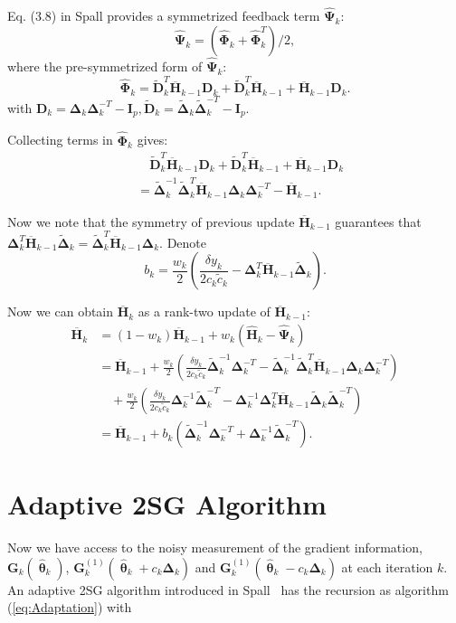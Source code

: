 \documentclass[conference]{IEEEtran}
\newcommand{\bD}{\bm{D}}
\newcommand{\bG}{\bm{G}}
\newcommand{\bI}{\bm{I}}
\newcommand{\bDelta}{\bm{\Delta}}
\newcommand{\oH}{\bm{\overline{H}}}
\newcommand{\hH}{\bm{\hat{H}}}
\newcommand{\hPsi}{\bm{\hat{\Psi}}}
\newcommand{\htheta}{\bm{\hat{\uptheta}}}
\newcommand{\hPhi}{\bm{\hat{\Phi}}}
\newcommand{\tDelta}{\bm{\tilde{\Delta}}}
\newcommand{\tD}{\bm{\tilde{D}}}
\begin{document}
Eq. (3.8) in Spall \cite{Spall2009} provides a symmetrized feedback term $ \hPsi_k $:
\begin{equation} \label{eq:PsiHat}
\hPsi_k =(\hPhi_k+\hPhi_k^T)/2,
\end{equation}
where the pre-symmetrized form of $ \hPsi_k $:
\begin{equation}
\hPhi_k=\tD_k^T\oH_{k-1}\bD_k+\tD_k^T\oH_{k-1}+\oH_{k-1}\bD_k.
\end{equation}
with $ \bD_k=\bDelta_k\bDelta_k^{-T}-\bI_p, \tD_k=\tDelta_k\tDelta_k^{-T}-\bI_p $.

Collecting terms in $\hPhi_k$ gives:
\begin{align*}
&\quad\tD_k^T\oH_{k-1}\bD_k+\tD_k^T\oH_{k-1}+\oH_{k-1}\bD_k\\
&=\tDelta_k^{-1}\tDelta_k^{T}\oH_{k-1}\bDelta_k\bDelta_k^{-T}-\oH_{k-1}.
\end{align*}

Now we note that the symmetry of previous update $ \oH_{k-1}$ guarantees that
$\bDelta_k^{T}\oH_{k-1}\tDelta_k=\tDelta_k^{T}\oH_{k-1}\bDelta_k$. Denote
\begin{equation}
  b_k=\frac{w_k}{2}(\frac{\delta y_k}{2c_k\tilde{c}_k}-\bDelta_k^{T}\oH_{k-1}\tDelta_k).
\end{equation}

Now we can obtain $\oH_k$ as a rank-two update of $\oH_{k-1}$:
\begin{align*}
\oH_k&=(1-w_k)\oH_{k-1}+w_k(\hH_k-\hPsi_k)\\
     &=\oH_{k-1}+\frac{w_k}{2}(\frac{\delta y_k}{2c_k\tilde{c}_k}\tDelta_k^{-1}\bDelta_k^{-T}-\tDelta_k^{-1}\tDelta_k^{T}\oH_{k-1}\bDelta_k\bDelta_k^{-T})\\
     &\quad +\frac{w_k}{2}(\frac{\delta y_k}{2c_k\tilde{c}_k}\bDelta_k^{-1}\tDelta_k^{-T}-\bDelta_k^{-1}\bDelta_k^{T}\oH_{k-1}\tDelta_k\tDelta_k^{-T})\\
     &=\oH_{k-1}+b_k(\tDelta_k^{-1}\bDelta_k^{-T}+\bDelta_k^{-1}\tDelta_k^{-T}).
\end{align*}





\section{Adaptive 2SG Algorithm} \label{2SG}
Now we have
access to the noisy measurement of the gradient information,
$\bG_k(\htheta_k)$, $\bG_k^{(1)}(\htheta_k+ c_k\bDelta_k)$ and
$\bG_k^{(1)}(\htheta_k- c_k\bDelta_k)$ at each iteration $k$. An
adaptive 2SG algorithm introduced in Spall~\cite{Spall2000} has the
recursion as algorithm (\ref{eq:Adaptation}) with
\end{document}
